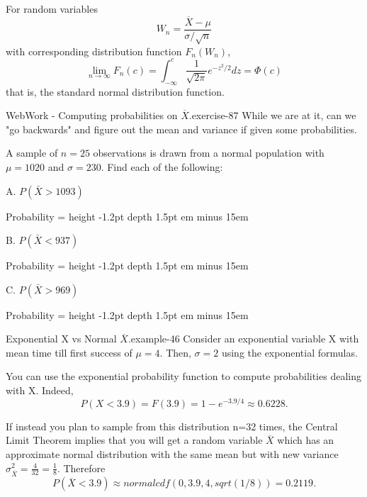 \documentclass[10pt,]{book}
\newcommand{\fillin}[1]{\leavevmode\leaders\vrule height -1.2pt depth 1.5pt \hskip #1em minus #1em \null}
\numberwithin{equation}{section}
\newcommand{\lt}{<}
\begin{document}
\par
\hypertarget{p-1279}{}%
For random variables%
\begin{equation*}
W_n = \frac{\overline{X} - \mu}{\sigma/ \sqrt{n}}
\end{equation*}
with corresponding distribution function \(F_n(W_n)\),%
\begin{equation*}
\lim_{n \rightarrow \infty} F_n(c) = \int_{-\infty}^c \frac{1}{\sqrt{2 \pi}} e^{-z^2/2} dz = \Phi(c)
\end{equation*}
that is, the standard normal distribution function.%
\par
\hypertarget{p-1280}{}%
\begin{inlineexercise}{WebWork - Computing probabilities on \(\overline{X}\).}{exercise-87}%
\hypertarget{p-1281}{}%
While we are at it, can we "go backwards" and figure out the mean and variance if given some probabilities.%
\par\medskip
\hypertarget{p-1282}{}%
A sample of \(n= 25\) observations is drawn from a normal population with \(\mu = 1020\) and \(\sigma = 230\).  Find each of the following:%
\par
\hypertarget{p-1283}{}%
A. \(P(\bar{X} > 1093)\)%
\par
\hypertarget{p-1284}{}%
Probability =  \fillin{15}%
\par
\hypertarget{p-1285}{}%
B. \(P(\bar{X} \lt  937)\)%
\par
\hypertarget{p-1286}{}%
Probability =  \fillin{15}%
\par
\hypertarget{p-1287}{}%
C. \(P(\bar{X} > 969)\)%
\par
\hypertarget{p-1288}{}%
Probability =  \fillin{15}%
\end{inlineexercise}
%
\par
\hypertarget{p-1289}{}%
\begin{example}{Exponential X vs Normal \(\overline{X}\).}{example-46}%
\hypertarget{p-1290}{}%
Consider an exponential variable X with mean time till first success of \(\mu = 4\).  Then, \(\sigma = 2\) using the exponential formulas.%
\par
\hypertarget{p-1291}{}%
You can use the exponential probability function to compute probabilities dealing with X. Indeed,%
\begin{equation*}
P(X \lt 3.9) = F(3.9) = 1 - e^{-3.9/4} \approx 0.6228 .
\end{equation*}
%
\par
\hypertarget{p-1292}{}%
If instead you plan to sample from this distribution n=32 times, the Central Limit Theorem implies that you will get a random variable \(\overline{X}\) which has an approximate normal distribution with the same mean but with new variance \(\sigma_{\overline{X}}^2 = \frac{4}{32} = \frac{1}{8}\).  Therefore%
\begin{equation*}
P( \overline{X} \lt 3.9 ) \approx normalcdf(0,3.9,4,sqrt(1/8)) = 0.2119 .
\end{equation*}
%
\end{example}
\end{document}
